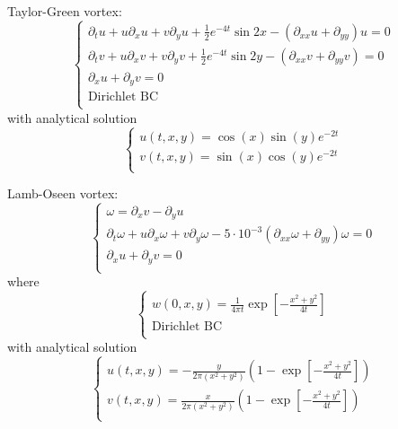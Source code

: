 \documentclass{article}
\begin{document}
\begin{enumerate}[label={[\arabic*]}]
\item{Taylor-Green vortex: 
\[\left\{ \begin{array}{llllllll}
\partial_t u + u \partial_x u+ v\partial_y u+\frac{1}{2} e^{-4 t}\sin{2x}-(\partial_{xx}u+\partial_{yy})u=0\\
\partial_t v + u \partial_x v+ v\partial_y v+\frac{1}{2} e^{-4 t}\sin{2y}-(\partial_{xx}v+\partial_{yy}v)=0\\
\partial_x u+ \partial_y v=0\\
\mbox{Dirichlet BC}\\
\end{array}
\right.\]
with analytical solution
\[\left\{
\begin{array}{l}
 u(t,x,y)=\cos(x)\sin(y) e^{-2t}\\
 v(t,x,y)=\sin(x)\cos(y) e^{-2t} \\
\end{array}\right.\]\label{eq:TaylorGreen}}

\item{Lamb-Oseen vortex: 
\[\left\{ \begin{array}{llllllll}
\omega=\partial_x v - \partial_y u\\
\partial_t \omega + u \partial_x \omega+ v\partial_y \omega-5\cdot10^{-3}(\partial_{xx}\omega+\partial_{yy})\omega=0\\
\partial_x u+ \partial_y v=0\\
\end{array}
\right.\]
where 
\[\left\{
\begin{array}{lllll}
\displaystyle w(0,x,y)=\frac{1}{4\pi t}\exp\left[-\frac{x^2+y^2}{4 t}\right]\\
\mbox{Dirichlet BC}\\
\end{array}
\right.\]
with analytical solution
\[\left\{
\begin{array}{l}
\displaystyle u(t,x,y)=-\frac{y}{2\pi(x^2+y^2)}\left(1-\exp\left[-\frac{x^2+y^2}{4 t}\right]\right)\\
\displaystyle v(t,x,y)=\frac{x}{2\pi(x^2+y^2)}\left(1-\exp\left[-\frac{x^2+y^2}{4 t}\right]\right) \\
\end{array}\right.\]\label{eq:LambOseen}}


\end{enumerate}
\end{document}
